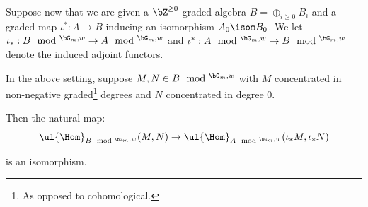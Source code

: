Suppose now that we are given a $\bZ^{\geq 0}$-graded
algebra $B = \oplus_{i \geq 0} B_i$
and a graded map $\iota^*:A \to B$ inducing
an isomorphism $A_0 \isom B_0$. We let $\iota_*:B\mod^{\bG_m,w} \to A\mod^{\bG_m,w}$
and $\iota^*:A\mod^{\bG_m,w} \to B\mod^{\bG_m,w}$ denote the induced
adjoint functors.

\begin{prop}
\notready\label{p:gr-hom}

In the above setting, suppose $M,N \in B\mod^{\bG_m,w}$ with
$M$ concentrated in non-negative graded\footnote{As opposed to cohomological.}
degrees and $N$ concentrated in degree $0$.

Then the natural map:
%
\[
\ul{\Hom}_{B\mod^{\bG_m,w}}(M,N) \to
\ul{\Hom}_{A\mod^{\bG_m,w}}(\iota_*M,\iota_* N)
\]

 is an isomorphism.

\end{prop}

